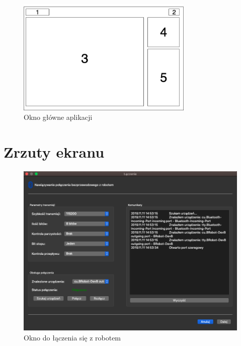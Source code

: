 \begin{figure}[h!]
    \centering
    \includegraphics[width=0.75\textwidth]{Rysunki/Rozdzial06/Glowne_okno_koncepcja.png}
    \caption{Okno główne aplikacji}
    \label{Okno glowne}
\end{figure}

\newpage
\section{Zrzuty ekranu}

\begin{figure}[h!]
    \centering
    \includegraphics[width=1\textwidth]{Rysunki/Rozdzial06/Okno_laczenia.png}
    \caption{Okno do łączenia się z robotem}
    \label{Okno laczenie}
\end{figure}

